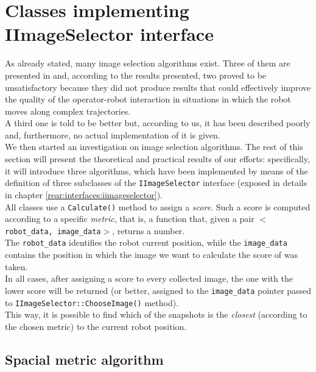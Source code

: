 \section{Classes implementing IImageSelector interface}
\label{concr:iimageselector}

As already stated, many image selection algorithms exist. 
Three of them are presented in \cite{sugimoto} and, according 
to the results presented, two proved to be unsatisfactory because 
they did not produce results that could effectively improve 
the quality of the operator-robot interaction in situations 
in which the robot moves along complex trajectories.
\\
A third one is told to be better but, according to us, it has 
been described poorly and, furthermore, no actual implementation 
of it is given.
\\
We then started an investigation on image selection algorithms.
The rest of this section will present the theoretical and practical
results of our efforts: specifically, it will introduce 
three algorithms, which have been implemented by means of 
the definition of three subclasses of the 
\texttt{IImageSelector} interface (exposed in details
in chapter \ref{rear:interfaces:iimageselector}).
\\
All classes use a \texttt{Calculate()} method to assign a 
\textit{score}. Such a score is computed according to 
a specific \textit{metric}, that is, a function that, 
given a pair $<$\texttt{robot\_data, image\_data}$>$, 
returns a number. 
\\
The \texttt{robot\_data} identifies the robot current position, 
while the \texttt{image\_data} contains the position 
in which the image we want to calculate the score of
was taken.
\\
In all cases, after assigning a score to every collected image, 
the one with the lower score will be returned 
(or better, assigned to the \texttt{image\_data} pointer 
passed to \texttt{IImageSelector::ChooseImage()} method).
\\
This way, it is possible to find which of the snapshots is 
the \textit{closest} (according to the chosen metric) to 
the current robot position.

\subsection{Spacial metric algorithm}
\label{concr:iimageselector:spacial_metric_algorithm}

